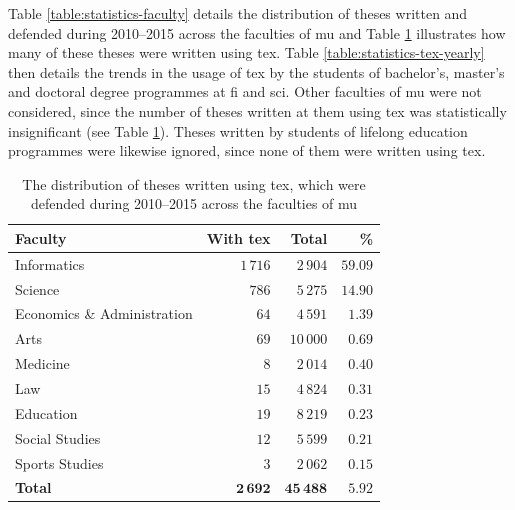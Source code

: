 \documentclass[12pt,twoside,color,table]%
  {fithesis3/fithesis3} %
\begin{document}
  Table \ref{table:statistics-faculty} details the distribution of
  theses written and defended during 2010--2015 across the
  faculties of \gls{mu} and Table \ref{table:statistics-tex}
  illustrates how many of these theses were written using
  \gls{tex}. Table \ref{table:statistics-tex-yearly} then details
  the trends in the usage of \gls{tex} by the students of
  bachelor's, master's and doctoral degree programmes at \gls{fi}
  and \gls{sci}. Other faculties of \gls{mu} were not considered,
  since the number of theses written at them using \gls{tex} was
  statistically insignificant (see Table
  \ref{table:statistics-tex}). Theses written by students of
  lifelong education programmes were likewise ignored, since none
  of them were written using \gls{tex}.

  \begin{table}
    \caption{The distribution of theses written using \gls{tex},
      which were defended during 2010--2015 across the faculties of
      \acrshort{mu}}
    \begin{tabularx}{\textwidth}{Xrrr}
      \textbf{Faculty} & \textbf{With \gls{tex}} & \textbf{Total} &
      \textbf{\%} \\
      \toprule
      Informatics                 & $1\,716$ & $2\,904$  &
      $59.09$ \\%
      Science                     & $786$     & $5\,275$  &
      $14.90$ \\%
      Economics \& Administration & $64$      & $4\,591$  &
      $1.39$  \\%
      Arts                        & $69$      & $10\,000$ &
      $0.69$  \\%
      Medicine                    & $8$       & $2\,014$  &
      $0.40$  \\%
      Law                         & $15$      & $4\,824$  &
      $0.31$  \\%
      Education                   & $19$      & $8\,219$  &
      $0.23$  \\%
      Social Studies              & $12$      & $5\,599$  &
      $0.21$  \\%
      Sports Studies              & $3$       & $2\,062$  &
      $0.15$  \\%
      \bottomrule
      \textbf{Total} & $\mathbf{2\,692}$ & $\mathbf{45\,488}$ &
      $\mathbf{5.92}$
    \end{tabularx}
    \label{table:statistics-tex}
  \end{table}
\end{document}
